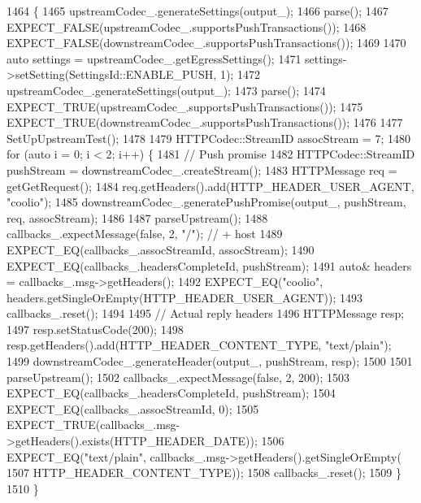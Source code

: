 \begin{DoxyCode}
1464                                          \{
1465   upstreamCodec\_.generateSettings(output\_);
1466   parse();
1467   EXPECT\_FALSE(upstreamCodec\_.supportsPushTransactions());
1468   EXPECT\_FALSE(downstreamCodec\_.supportsPushTransactions());
1469 
1470   \textcolor{keyword}{auto} settings = upstreamCodec\_.getEgressSettings();
1471   settings->setSetting(SettingsId::ENABLE\_PUSH, 1);
1472   upstreamCodec\_.generateSettings(output\_);
1473   parse();
1474   EXPECT\_TRUE(upstreamCodec\_.supportsPushTransactions());
1475   EXPECT\_TRUE(downstreamCodec\_.supportsPushTransactions());
1476 
1477   SetUpUpstreamTest();
1478 
1479   HTTPCodec::StreamID assocStream = 7;
1480   \textcolor{keywordflow}{for} (\textcolor{keyword}{auto} i = 0; i < 2; i++) \{
1481     \textcolor{comment}{// Push promise}
1482     HTTPCodec::StreamID pushStream = downstreamCodec\_.createStream();
1483     HTTPMessage req = getGetRequest();
1484     req.getHeaders().add(HTTP\_HEADER\_USER\_AGENT, \textcolor{stringliteral}{"coolio"});
1485     downstreamCodec\_.generatePushPromise(output\_, pushStream, req, assocStream);
1486 
1487     parseUpstream();
1488     callbacks\_.expectMessage(\textcolor{keyword}{false}, 2, \textcolor{stringliteral}{"/"}); \textcolor{comment}{// + host}
1489     EXPECT\_EQ(callbacks\_.assocStreamId, assocStream);
1490     EXPECT\_EQ(callbacks\_.headersCompleteId, pushStream);
1491     \textcolor{keyword}{auto}& headers = callbacks\_.msg->getHeaders();
1492     EXPECT\_EQ(\textcolor{stringliteral}{"coolio"}, headers.getSingleOrEmpty(HTTP\_HEADER\_USER\_AGENT));
1493     callbacks\_.reset();
1494 
1495     \textcolor{comment}{// Actual reply headers}
1496     HTTPMessage resp;
1497     resp.setStatusCode(200);
1498     resp.getHeaders().add(HTTP\_HEADER\_CONTENT\_TYPE, \textcolor{stringliteral}{"text/plain"});
1499     downstreamCodec\_.generateHeader(output\_, pushStream, resp);
1500 
1501     parseUpstream();
1502     callbacks\_.expectMessage(\textcolor{keyword}{false}, 2, 200);
1503     EXPECT\_EQ(callbacks\_.headersCompleteId, pushStream);
1504     EXPECT\_EQ(callbacks\_.assocStreamId, 0);
1505     EXPECT\_TRUE(callbacks\_.msg->getHeaders().exists(HTTP\_HEADER\_DATE));
1506     EXPECT\_EQ(\textcolor{stringliteral}{"text/plain"}, callbacks\_.msg->getHeaders().getSingleOrEmpty(
1507                   HTTP\_HEADER\_CONTENT\_TYPE));
1508     callbacks\_.reset();
1509   \}
1510 \}
\end{DoxyCode}
